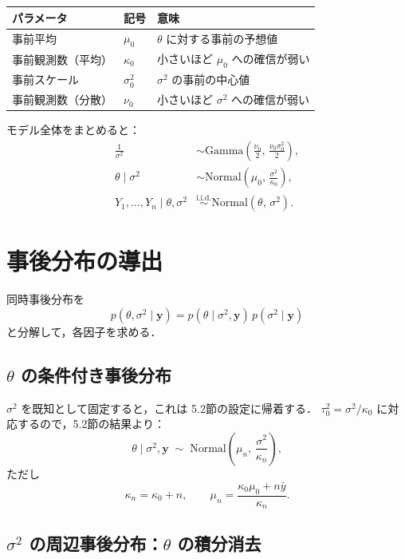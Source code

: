 \documentclass[lualatex,ja=standard,a4paper,12pt]{bxjsarticle}
\begin{document}
\bigskip
\begin{center}
\renewcommand{\arraystretch}{1.3}
\begin{tabular}{lll}
\toprule
パラメータ & 記号 & 意味 \\
\midrule
事前平均 & $\mu_0$ & $\theta$ に対する事前の予想値 \\
事前観測数（平均） & $\kappa_0$ & 小さいほど $\mu_0$ への確信が弱い \\
事前スケール & $\sigma_0^2$ & $\sigma^2$ の事前の中心値 \\
事前観測数（分散） & $\nu_0$ & 小さいほど $\sigma^2$ への確信が弱い \\
\bottomrule
\end{tabular}
\end{center}

\bigskip
モデル全体をまとめると：
\begin{align*}
  \frac{1}{\sigma^2} &\sim \mathrm{Gamma}\!\left(\frac{\nu_0}{2},\, \frac{\nu_0\sigma_0^2}{2}\right), \\[4pt]
  \theta \mid \sigma^2 &\sim \mathrm{Normal}\!\left(\mu_0,\, \frac{\sigma^2}{\kappa_0}\right), \\[4pt]
  Y_1, \ldots, Y_n \mid \theta, \sigma^2 &\overset{\mathrm{i.i.d.}}{\sim} \mathrm{Normal}(\theta,\, \sigma^2).
\end{align*}


\section{事後分布の導出}

同時事後分布を
\[
  p(\theta, \sigma^2 \mid \mathbf{y}) = p(\theta \mid \sigma^2, \mathbf{y})\, p(\sigma^2 \mid \mathbf{y})
\]
と分解して，各因子を求める．

\subsection{$\theta$ の条件付き事後分布}

$\sigma^2$ を既知として固定すると，これは 5.2節の設定に帰着する．
$\tau_0^2 = \sigma^2/\kappa_0$ に対応するので，5.2節の結果より：
\[
  \theta \mid \sigma^2, \mathbf{y}
  \;\sim\; \mathrm{Normal}\!\left(\mu_n,\, \frac{\sigma^2}{\kappa_n}\right),
\]
ただし
\[
  \kappa_n = \kappa_0 + n, \qquad
  \mu_n = \frac{\kappa_0\mu_0 + n\bar{y}}{\kappa_n}.
\]

\subsection{$\sigma^2$ の周辺事後分布：$\theta$ の積分消去}
\end{document}
